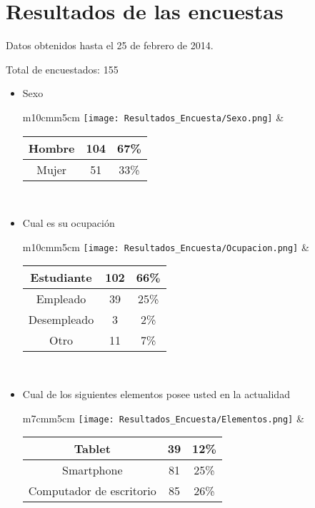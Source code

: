 \section{Resultados de las encuestas}

\begin{center}
Datos obtenidos hasta el 25 de febrero de 2014.
\end{center}
Total de encuestados: 155
\begin{itemize}
  \item Sexo \\
      \begin{tabular}{m{10cm}m{5cm}}
        \texttt{[image: Resultados\_Encuesta/Sexo.png]} &
        \begin{tabular}{|c|cc|}
        \hline
         Hombre & 104 & 67\% \\ \hline
         Mujer & 51 &  33\%\\ \hline 
        \end{tabular} \\
      \end{tabular}
  \item Cual es su ocupación \\
      \begin{tabular}{m{10cm}m{5cm}}
        \texttt{[image: Resultados\_Encuesta/Ocupacion.png]} &
        \begin{tabular}{|c|cc|}
        \hline
         Estudiante & 102 & 66\% \\ \hline
         Empleado & 39 & 25\% \\ \hline 
         Desempleado & 3 & 2\% \\ \hline
         Otro & 11 & 7\% \\ \hline
        \end{tabular} \\
      \end{tabular}
  \item Cual de los siguientes elementos posee usted en la actualidad \\
      \begin{tabular}{m{7cm}m{5cm}}
        \texttt{[image: Resultados\_Encuesta/Elementos.png]} &
        \begin{tabular}{|c|cc|}
        \hline
         Tablet & 39 & 12\% \\ \hline
         Smartphone & 81 & 25\% \\ \hline
         Computador de escritorio & 85 & 26\% \\ \hline

\end{tabular}
\end{tabular}
\end{itemize}
